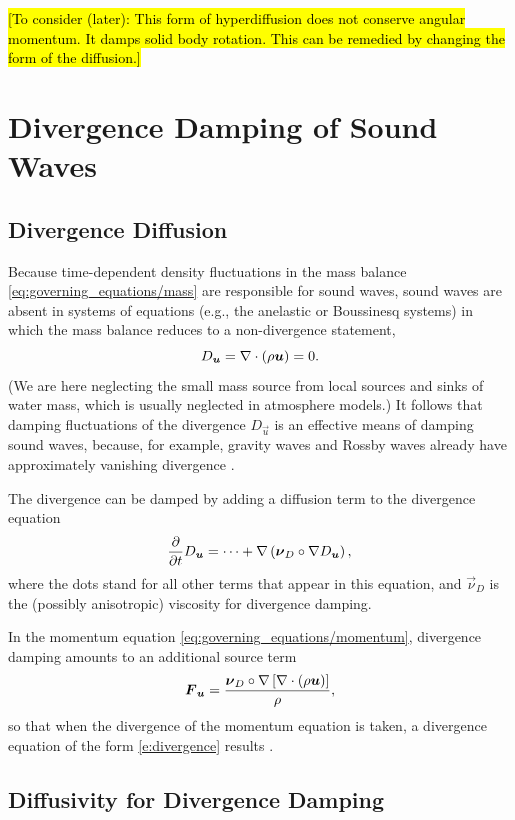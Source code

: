 \documentclass{report}
\begin{document}
\hl{[To consider (later): This form of hyperdiffusion does not conserve angular momentum. It damps solid body rotation. This can be remedied by changing the form of the diffusion.]}

\section{Divergence Damping of Sound Waves}

\subsection{Divergence Diffusion}

Because time-dependent density fluctuations in the mass balance \eqref{eq:governing_equations/mass} are responsible for sound waves, sound waves are absent in systems of equations (e.g., the anelastic or Boussinesq systems) in which the mass balance reduces to a non-divergence statement,
\[
D_{\boldsymbol{{u}}} = \nabla \cdot (\rho \boldsymbol{{u}}) = 0.
\]
(We are here neglecting the small mass source from local sources and sinks of water mass, which is usually neglected in atmosphere models.) It follows that damping fluctuations of the divergence $D_{\vec{u}}$ is an effective means of damping sound waves, because, for example, gravity waves and Rossby waves already have approximately vanishing divergence \citep{Skamarock92a}. 

The divergence can be damped by adding a diffusion term to the divergence equation
\begin{equation}\label{e:divergence}
\frac{\partial}{\partial t} D_{\boldsymbol{{u}}}  = \cdots + \nabla \left( \boldsymbol{{\nu}}_D \circ \nabla D_{\boldsymbol{{u}}} \right),
\end{equation}
where the dots stand for all other terms that appear in this equation, and $\vec{\nu}_D$ is the (possibly anisotropic) viscosity for divergence damping.

In the momentum equation \eqref{eq:governing_equations/momentum}, divergence damping amounts to an additional source term
\begin{equation}
\boldsymbol{{F}}_{\boldsymbol{{u}}} = \frac{\boldsymbol{{\nu}}_D \circ \nabla\left[\nabla \cdot (\rho \boldsymbol{{u}}) \right]}{\rho},
\end{equation}
so that when the divergence of the momentum equation is taken, a divergence equation of the form \eqref{e:divergence} results \citep[cf.][]{Jablonowski11a}. 

\subsection{Diffusivity for Divergence Damping}
\end{document}
